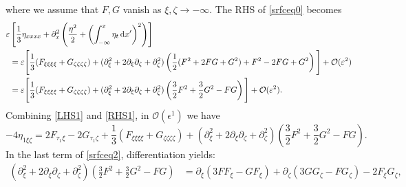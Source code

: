 \documentclass[11pt,reqno,oneside,a4paper]{article}
\begin{document}
where we assume that $F,G$ vanish as $\xi, \zeta \to -\infty.$
The RHS of \eqref{srfceq0} becomes
\begin{align}
\varepsilon &\left[ \frac{1}{3}\eta_{xxxx} +  \partial_x^2 \left( \frac{\eta^2}{2} + \left( \int^{x}_{-\infty} \eta_t \,\mathrm{d} x' \right)^2\right)\right] \nonumber\\
&=\varepsilon \Bigg[ \frac{1}{3}(F_{\xi\xi\xi\xi} + G_{\zeta\zeta\zeta\zeta}) +  (\partial_\xi^2 + 2\partial_\xi \partial_\zeta + \partial_\zeta^2) \left(\frac{1}{2} (F^2 + 2FG +G^2) + F^2 - 2FG + G^2 \right)\Bigg] + \mathcal{O}(\varepsilon^2) \nonumber \\
&= \varepsilon \Bigg[ \frac{1}{3}(F_{\xi\xi\xi\xi} + G_{\zeta\zeta\zeta\zeta}) +  (\partial_\xi^2 + 2\partial_\xi \partial_\zeta + \partial_\zeta^2) \left(\frac{3}{2} F^2  + \frac{3}{2}G^2 - FG \right) \Bigg] + \mathcal{O}(\varepsilon^2). \label{RHS1}
\end{align}
Combining \eqref{LHS1} and \eqref{RHS1}, in $\mathcal{O}(\epsilon^1)$ we have
\begin{equation}\label{srfceq2}
- 4\eta_{1\xi \zeta} = 2F_{\tau_1 \xi} - 2G_{\tau_1 \zeta} + \frac{1}{3}(F_{\xi\xi\xi\xi} + G_{\zeta\zeta\zeta\zeta}) + (\partial_\xi^2 + 2\partial_\xi \partial_\zeta + \partial_\zeta^2) \left(\frac{3}{2} F^2  + \frac{3}{2}G^2 - FG \right).
\end{equation}
In the last term of \eqref{srfceq2}, differentiation yields:
\begin{align*}
(\partial_\xi^2 + 2\partial_\xi \partial_\zeta + \partial_\zeta^2) \left(\frac{3}{2} F^2  + \frac{3}{2}G^2 - FG\right) &= \partial_\xi(3 F F_\xi - G F_\xi) + \partial_\zeta(3 G G_\zeta - F G_\zeta) - 2 F_\xi G_\zeta,
\end{align*}
\end{document}
